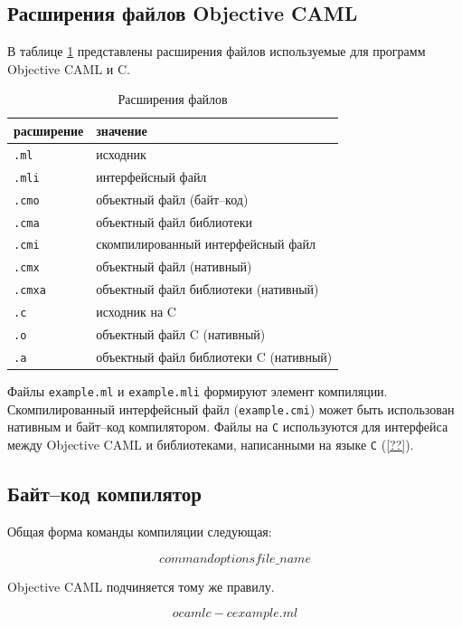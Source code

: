 \subsection{Расширения файлов Objective CAML}

В таблице \ref{tbl:file_extensions} представлены расширения файлов используемые
для программ Objective CAML и C.

\begin{table}
	\begin{tabular}{|l|l|}
	\hline
	расширение & значение \\
	\hline
	\texttt{.ml} & исходник \\
	\hline
	\texttt{.mli} & интерфейсный файл \\
	\hline
	\texttt{.cmo} & объектный файл (байт--код) \\
	\hline
	\texttt{.cma} & объектный файл библиотеки \\
	\hline
	\texttt{.cmi} & скомпилированный интерфейсный файл \\
	\hline
	\texttt{.cmx} & объектный файл (нативный) \\
	\hline
	\texttt{.cmxa} & объектный файл библиотеки (нативный) \\
	\hline
	\texttt{.c} & исходник на C \\
	\hline
	\texttt{.o} & объектный файл C (нативный) \\
	\hline
	\texttt{.a} & объектный файл библиотеки C (нативный) \\
	\hline
	\end{tabular}
	\caption{\label{tbl:file_extensions}Расширения файлов}
\end{table}

Файлы \texttt{example.ml} и \texttt{example.mli} формируют элемент компиляции.
Скомпилированный интерфейсный файл (\texttt{example.cmi}) может быть использован
нативным и байт--код компилятором. Файлы на \texttt{C} используются для
интерфейса между Objective CAML и библиотеками, написанными на языке \texttt{C}
(\ref{??}).

\subsection{Байт--код компилятор}

Общая форма команды компиляции следующая:

$$
command options file\_name
$$

Objective CAML подчиняется тому же правилу.

$$
ocamlc -c example.ml
$$

